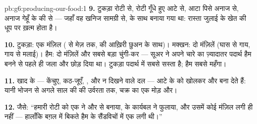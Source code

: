 \begin{solution}{pb:g6:producing-our-food:1}
\textbf{9.} टुकड़ा रोटी से, रोटी गूँधे हुए आटे से, आटा पिसे अनाज से,
अनाज गेहूँ के  की  से --- जहाँ वह खनिज सामग्री से, 
के साथ बनाया गया था: रास्ता जुलाई के खेत की धूप पर ख़त्म होता है।

\textbf{10.} टुकड़ा: एक मंज़िल ( से मेज़ तक,  की
आख़िरी छुअन के साथ)। मक्खन: दो मंज़िलें (घास से गाय, गाय से मलाई)। हैम:
दो मंज़िलें और सबसे बड़ा चुंगी-कर --- सूअर ने अपने चारे का ज़्यादातर
पदार्थ हैम बनने से पहले ही जला और छोड़ दिया था। टुकड़ा पदार्थ में सबसे
सस्ता है; हैम सबसे महँगा।

\textbf{11.} खाद के  --- केंचुए, कठ-जूएँ, , और न दिखने वाले दल
--- आटे के  को खोलकर  और  बना देते हैं:
यानी भोजन से अगले साल की  की उर्वरता तक, चक्र का एक मोड़ और।

\textbf{12.} जैसे: ``हमारी रोटी को एक  ने  और 
से बनाया,  के कार्यबल ने फुलाया, और उसमें कोई 
मंज़िल लगी ही नहीं --- हालाँकि बग़ल में बिकते हैम के सैंडविचों में एक
लगी थी।''
\end{solution}
